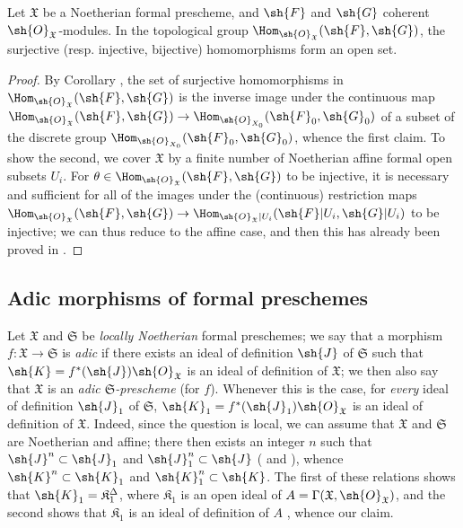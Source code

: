 \begin{proposition}[10.11.9]
\label{I.10.11.9}
Let $\mathfrak{X}$ be a Noetherian formal prescheme, and $\sh{F}$ and $\sh{G}$ coherent $\sh{O}_\mathfrak{X}$-modules.
In the topological group $\Hom_{\sh{O}_\mathfrak{X}}(\sh{F},\sh{G})$, the surjective (resp. injective, bijective) homomorphisms form an open set.
\end{proposition}

\begin{proof}
By Corollary , the set of surjective homomorphisms in $\Hom_{\sh{O}_\mathfrak{X}}(\sh{F},\sh{G})$ is the inverse image under the continuous map $\Hom_{\sh{O}_\mathfrak{X}}(\sh{F},\sh{G})\to\Hom_{\sh{O}_{X_0}}(\sh{F}_0,\sh{G}_0)$ of a subset of the discrete group $\Hom_{\sh{O}_{X_0}}(\sh{F}_0,\sh{G}_0)$, whence the first claim.
To show the second, we cover $\mathfrak{X}$ by a finite number of Noetherian affine formal open subsets $U_i$.
For $\theta\in\Hom_{\sh{O}_\mathfrak{X}}(\sh{F},\sh{G})$ to be injective, it is necessary and sufficient for all of the images under the (continuous) restriction maps $\Hom_{\sh{O}_\mathfrak{X}}(\sh{F},\sh{G})\to\Hom_{\sh{O}_\mathfrak{X}|U_i}(\sh{F}|U_i,\sh{G}|U_i)$ to be injective; we can thus reduce to the affine case, and then this has already been proved in .
\end{proof}

\subsection{Adic morphisms of formal preschemes}
\label{subsection:I.10.12}

\begin{env}[10.12.1]
\label{I.10.12.1}
Let $\mathfrak{X}$ and $\mathfrak{S}$ be \emph{locally Noetherian} formal preschemes;
we say that a morphism $f:\mathfrak{X}\to\mathfrak{S}$ is \emph{adic} if there exists an ideal of definition $\sh{J}$ of $\mathfrak{S}$ such that $\sh{K}=f^*(\sh{J})\sh{O}_\mathfrak{X}$ is an ideal of definition of $\mathfrak{X}$;
we then also say that $\mathfrak{X}$ is an \emph{adic $\mathfrak{S}$-prescheme} (for $f$).
Whenever this is the case, for \emph{every} ideal of definition $\sh{J}_1$ of $\mathfrak{S}$, $\sh{K}_1=f^*(\sh{J}_1)\sh{O}_\mathfrak{X}$ is an ideal of definition of $\mathfrak{X}$.
Indeed, since the question is local, we can assume that $\mathfrak{X}$ and $\mathfrak{S}$ are Noetherian and affine;
there then exists an integer $n$ such that $\sh{J}^n\subset\sh{J}_1$ and $\sh{J}_1^n\subset\sh{J}$ ( and ), whence $\sh{K}^n\subset\sh{K}_1$ and $\sh{K}_1^n\subset\sh{K}$.
The first of these relations shows that $\sh{K}_1=\mathfrak{K}_1^\Delta$, where $\mathfrak{K}_1$ is an open ideal of $A=\Gamma(\mathfrak{X},\sh{O}_\mathfrak{X})$, and the second shows that $\mathfrak{K}_1$ is an ideal of definition of $A$ , whence our claim.
\end{env}

